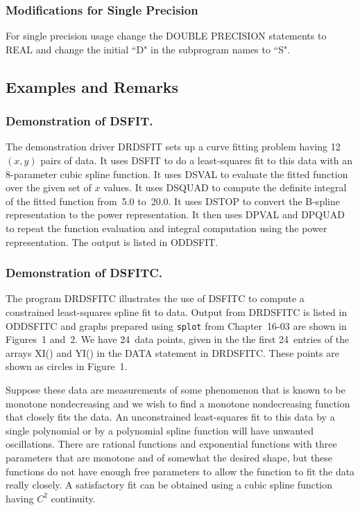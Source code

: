 \documentclass[twoside]{MATH77}
\begin{document}
\subsubsection{Modifications for Single Precision\label{modsp}}

For single precision usage change the DOUBLE PRECISION statements to REAL
and change the initial ``D" in the subprogram names to ``S".

\subsection{Examples and Remarks}

\subsubsection{Demonstration of DSFIT.}

The demonstration driver DRDSFIT sets up a curve fitting problem having 12~$%
(x,y)$ pairs of data. It uses DSFIT to do a least-squares fit to this data
with an 8-parameter cubic spline function. It uses DSVAL to evaluate the
fitted function over the given set of $x$ values. It uses DSQUAD to compute
the definite integral of the fitted function from~5.0 to~20.0. It uses DSTOP
to convert the B-spline representation to the power representation. It then
uses DPVAL and DPQUAD to repeat the function evaluation and integral
computation using the power representation. The output is listed in ODDSFIT.

\subsubsection{Demonstration of DSFITC.}

The program DRDSFITC illustrates the use of DSFITC to compute a constrained
least-squares spline fit to data. Output from DRDSFITC is listed in ODDSFITC
and graphs prepared using {\tt splot} from Chapter~16-03 are shown in
Figures~1 and~2. We have 24~data points, given in the the first 24~entries
of the arrays XI() and YI() in the DATA statement in DRDSFITC. These points
are shown as circles in Figure~1.

Suppose these data are measurements of some phenomenon that is known to be
monotone nondecreasing and we wish to find a monotone nondecreasing function
that closely fits the data. An unconstrained least-squares fit to this data
by a single polynomial or by a polynomial spline function will have unwanted
oscillations. There are rational functions and exponential functions with
three parameters that are monotone and of somewhat the desired shape, but
these functions do not have enough free parameters to allow the function to
fit the data really closely. A satisfactory fit can be obtained using a
cubic spline function having $C^2$ continuity.
\end{document}
